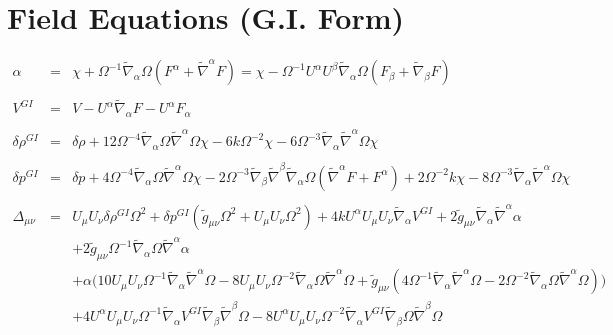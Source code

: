 \documentclass[10pt,letterpaper]{article}
\numberwithin{equation}{section}
\begin{document}
\section{Field Equations (G.I. Form)}
\begin{eqnarray}
\alpha  &=& \chi + \Omega^{-1}\tilde\nabla_\alpha \Omega(F^\alpha + \tilde\nabla^\alpha F) = 
\chi - \Omega^{-1}U^\alpha U^\beta\tilde\nabla_\alpha \Omega(F_\beta + \tilde\nabla_\beta F)
\\ \nonumber\\
V^{GI} &=& V-U^\alpha \tilde\nabla_\alpha F - U^\alpha F_\alpha
\\ \nonumber\\
\delta \rho^{GI}&=&\delta \rho +12\Omega^{-4}\tilde\nabla_\alpha\Omega\tilde\nabla^\alpha\Omega\chi-6k\Omega^{-2}\chi
-6\Omega^{-3}\tilde\nabla_\alpha\tilde\nabla^\alpha\Omega \chi
\\ \nonumber\\ 
\delta p^{GI}&=&\delta p +4\Omega^{-4}\tilde\nabla_\alpha\Omega\tilde\nabla^\alpha\Omega\chi -2\Omega^{-3}\tilde\nabla_\beta\tilde\nabla^\beta\tilde\nabla_\alpha\Omega(\tilde\nabla^\alpha F + F^\alpha)
+2\Omega^{-2}k \chi -8\Omega^{-3}\tilde\nabla_\alpha\tilde\nabla^\alpha\Omega\chi
\\ \nonumber\\
\Delta_{\mu\nu}&=& U_{\mu } U_{\nu } \delta \rho^{GI}{} \Omega^2 + \delta p^{GI}{} (\tilde{g}_{\mu \nu } \Omega^2 + U_{\mu } U_{\nu } \Omega^2) + 4 k U^{\alpha } U_{\mu } U_{\nu } \tilde{\nabla}_{\alpha }V^{GI}{} + 2 \tilde{g}_{\mu \nu } \tilde{\nabla}_{\alpha }\tilde{\nabla}^{\alpha }\alpha \nonumber \\ 
&& + 2 \tilde{g}_{\mu \nu } \Omega^{-1} \tilde{\nabla}_{\alpha }\Omega \tilde{\nabla}^{\alpha }\alpha \nonumber \\ 
&& + \alpha \bigl(10 U_{\mu } U_{\nu } \Omega^{-1} \tilde{\nabla}_{\alpha }\tilde{\nabla}^{\alpha }\Omega - 8 U_{\mu } U_{\nu } \Omega^{-2} \tilde{\nabla}_{\alpha }\Omega \tilde{\nabla}^{\alpha }\Omega + \tilde{g}_{\mu \nu } (4 \Omega^{-1} \tilde{\nabla}_{\alpha }\tilde{\nabla}^{\alpha }\Omega - 2 \Omega^{-2} \tilde{\nabla}_{\alpha }\Omega \tilde{\nabla}^{\alpha }\Omega)\bigr) \nonumber \\ 
&& + 4 U^{\alpha } U_{\mu } U_{\nu } \Omega^{-1} \tilde{\nabla}_{\alpha }V^{GI}{} \tilde{\nabla}_{\beta }\tilde{\nabla}^{\beta }\Omega - 8 U^{\alpha } U_{\mu } U_{\nu } \Omega^{-2} \tilde{\nabla}_{\alpha }V^{GI}{} \tilde{\nabla}_{\beta }\Omega \tilde{\nabla}^{\beta }\Omega \nonumber \\ 

\end{eqnarray}
\end{document}
